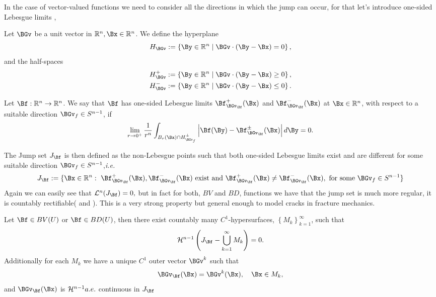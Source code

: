     In the case of vector-valued functions we need to consider all the directions in which the jump can occur, for that let's introduce one-sided Lebesgue limits \cite{Ambrosio1997},

\begin{definition} Let $\BGv$ be a unit vector in $\mathbb{R}^n, \Bx \in \mathbb{R}^n$. We define the hyperplane
$$
H_\BGv:=\left\{\By \in \mathbb{R}^n \mid \BGv \cdot(\By-\Bx)=0\right\},
$$
and the half-spaces
$$
\begin{aligned}
&H_\BGv^{+}:=\left\{\By \in \mathbb{R}^n \mid \BGv \cdot(\By-\Bx) \geq 0\right\}, \\
&H_\BGv^{-}:=\left\{\By \in \mathbb{R}^n \mid \BGv \cdot(\By-\Bx) \leq 0\right\} .
\end{aligned}
$$
\end{definition}

\begin{definition} Let $\Bf:\R^n\to\R^n$. We say that $\Bf$ has one-sided Lebesgue limits $\Bf_{\BGv_\Bf}^+(\Bx)$ and $\Bf_{\BGv_\Bf}^-(\Bx)$ at $\Bx\in \R^n$, with respect to a suitable direction $\BGv_f\in S^{n-1}$, if 
$$\lim _{r \rightarrow 0^{+}} \frac{1}{r^n} \int_{B_r\left(\Bx\right)\cap H^\pm_{\BGv_f}}\left|\Bf(\By)-\Bf_{\BGv_\Bf}^{\pm}(\Bx)\right| d \By=0.$$
\end{definition}

The Jump set $J_\Bf$ is then defined as the non-Lebesgue points such that both one-sided Lebesgue limits exist and are different for some suitable direction $\BGv_f\in S^{n-1}$,\textit{i.e.}
$$J_\Bf:=\{\Bx\in\R^n:\ \Bf_{\BGv_\Bf}^+(\Bx),\Bf_{\BGv_\Bf}^-(\Bx)\ \text{exist and }  \Bf_{\BGv_\Bf}^+(\Bx)\neq\Bf_{\BGv_\Bf}^-(\Bx),\ \text{for some } \BGv_f\in S^{n-1}\}$$
 Again we can easily see that $\CL^n(J_\Bf)=0,$ but in fact for both, $BV$ and $BD$, functions we have that the jump set is much more regular, it is countably rectifiable(\cite[Theorem 5.17]{evansGa} and \cite[Proposition 3.5]{Ambrosio1997}). This is a very strong property but general enough to model cracks in fracture mechanics.

\begin{theorem}[$\CH^{n-1}$ a.e. rectifiable] Let $\Bf\in BV(U)$ or $\Bf\in BD(U)$, then there exist countably many $C^1$-hypersurfaces, $\left\{M_k\right\}_{k=1}^{\infty}$, such that
    $$
    \mathcal{H}^{n-1}\left(J_\Bf-\bigcup_{k=1}^{\infty} M_k\right)=0.
    $$
    Additionally for each $M_k$ we have a unique $C^1$ outer vector $\BGv^k$ such that
     $$\BGv_\Bf(\Bx)=\BGv^k (\Bx),\quad \Bx\in M_k,$$
    and  $\BGv_\Bf(\Bx)$ is  ${\mathcal H}^{n-1} a.e.$ continuous  in $J_\Bf$ 
\end{theorem}

